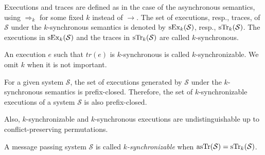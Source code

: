 Executions and traces are defined as in the case of the asynchronous semantics, using $\Rightarrow_k$ for some fixed $k$ instead of $\rightarrow$. The set of executions, resp., traces, of $\mathcal{S}$ under the $k$-synchronous semantics is denoted by $\synchExec{\mathcal{S}}{k}$, resp., $\synchTr{\mathcal{S}}{k}$. The executions in $\synchExec{\mathcal{S}}{k}$ and the traces in 
$\synchTr{\mathcal{S}}{k}$ are called $k$-synchronous. 

An execution $e$ such that $tr(e)$ is $k$-synchronous is called $k$-synchronizable. We omit $k$ when it is not important. 

For a given system $\mathcal{S}$, the set of executions generated by $\mathcal{S}$ under the $k$-synchronous semantics is prefix-closed. Therefore, the set of $k$-synchronizable executions of a system $\mathcal{S}$ is also prefix-closed.


Also, $k$-synchronizable and $k$-synchronous executions are undistinguishable up to conflict-preserving permutations.



\begin{definition}\label{def:synchron}
A message passing system $\mathcal{S}$ is called \emph{$k$-synchronizable} when $\asynchTr{\mathcal{S}}=\synchTr{\mathcal{S}}{k}$.
\end{definition}


